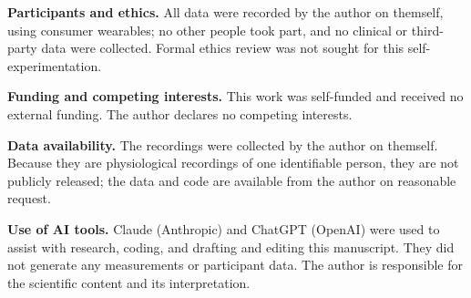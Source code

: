 
\label{draft-declarations-and-author-review}

\textbf{Participants and ethics.} All data were recorded by the author on themself, using consumer wearables; no other people took part, and no clinical or third-party data were collected. Formal ethics review was not sought for this self-experimentation.

\textbf{Funding and competing interests.} This work was self-funded and received no external funding. The author declares no competing interests.

\textbf{Data availability.} The recordings were collected by the author on themself. Because they are physiological recordings of one identifiable person, they are not publicly released; the data and code are available from the author on reasonable request.

\textbf{Use of AI tools.} Claude (Anthropic) and ChatGPT (OpenAI) were used to assist with research, coding, and drafting and editing this manuscript. They did not generate any measurements or participant data. The author is responsible for the scientific content and its interpretation.
